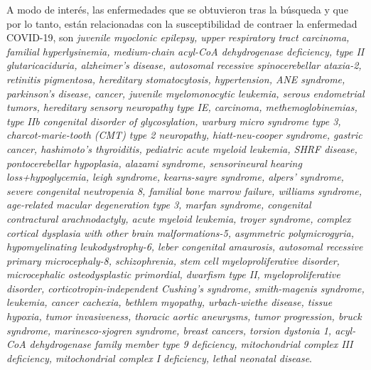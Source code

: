 A modo de interés, las enfermedades que se obtuvieron tras la búsqueda y que por lo tanto, están relacionadas con la susceptibilidad de contraer la enfermedad COVID-19, son \textit{juvenile myoclonic epilepsy, upper respiratory tract carcinoma, familial hyperlysinemia, medium-chain acyl-CoA dehydrogenase deficiency, type II glutaricaciduria, alzheimer's disease, autosomal recessive spinocerebellar ataxia-2, retinitis pigmentosa, hereditary stomatocytosis, hypertension, ANE syndrome, parkinson's disease, cancer, juvenile myelomonocytic leukemia, serous endometrial tumors, hereditary sensory neuropathy type IE, carcinoma, methemoglobinemias, type IIb congenital disorder of glycosylation, warburg micro syndrome type 3, charcot-marie-tooth (CMT) type 2 neuropathy, hiatt-neu-cooper syndrome, gastric cancer, hashimoto's thyroiditis, pediatric acute myeloid leukemia, SHRF disease, pontocerebellar hypoplasia, alazami syndrome, sensorineural hearing loss+hypoglycemia, leigh syndrome, kearns-sayre syndrome, alpers' syndrome, severe congenital neutropenia 8, familial bone marrow failure, williams syndrome, age-related macular degeneration type 3, marfan syndrome, congenital contractural arachnodactyly, acute myeloid leukemia, troyer syndrome, complex cortical dysplasia with other brain malformations-5, asymmetric polymicrogyria, hypomyelinating leukodystrophy-6, leber congenital amaurosis, autosomal recessive primary microcephaly-8, schizophrenia, stem cell myeloproliferative disorder, microcephalic osteodysplastic primordial,  dwarfism type II, myeloproliferative disorder, corticotropin-independent Cushing's syndrome, smith-magenis syndrome, leukemia, cancer cachexia, bethlem myopathy, urbach-wiethe disease, tissue hypoxia, tumor invasiveness, thoracic aortic aneurysms, tumor progression, bruck syndrome, marinesco-sjogren syndrome, breast cancers, torsion dystonia 1, acyl-CoA dehydrogenase family member type 9 deficiency, mitochondrial complex III deficiency, mitochondrial complex I deficiency, lethal neonatal disease}.